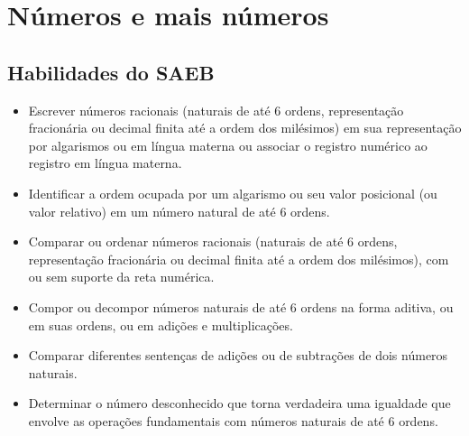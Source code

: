 \chapter{Números e mais números}


\section{Habilidades do SAEB}

\begin{itemize}
\item Escrever números racionais (naturais de até 6 ordens, representação
fracionária ou decimal finita até a ordem dos milésimos) em sua
representação por algarismos ou em língua materna ou associar o registro
numérico ao registro em língua materna.

\item Identificar a ordem ocupada por um algarismo ou seu valor posicional
(ou valor relativo) em um número natural de até 6 ordens.

\item Comparar ou ordenar números racionais (naturais de até 6 ordens,
representação fracionária ou decimal finita até a ordem dos milésimos),
com ou sem suporte da reta numérica.

\item Compor ou decompor números naturais de até 6 ordens na forma aditiva,
ou em suas ordens, ou em adições e multiplicações.

\item Comparar diferentes sentenças de adições ou de subtrações de dois números naturais.

\item Determinar o número desconhecido que torna verdadeira uma igualdade
que envolve as operações fundamentais com números naturais de até 6
ordens.
\end{itemize}


